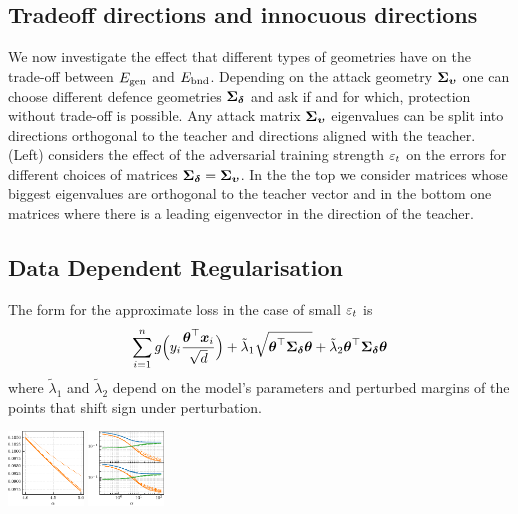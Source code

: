 \documentclass[a0paper,fleqn]{betterportraitposter}
\theoremstyle{plain}
\theoremstyle{definition}
\theoremstyle{remark}
\begin{document}
{\begin{multicols}{3}
\subsection{Tradeoff directions and innocuous directions}
We now investigate the effect that different types of geometries have on the trade-off between \(E_{\mathrm{gen}}\) and \(E_{\mathrm{bnd}}\). 
Depending on the attack geometry \(\boldsymbol{\Sigma}_{\boldsymbol{\upsilon}}\) one can choose different defence geometries \(\boldsymbol{\Sigma}_{\boldsymbol{\delta}}\) and ask if and for which, protection without trade-off is possible. 
Any attack matrix \(\boldsymbol{\Sigma}_{\boldsymbol{\upsilon}}\) eigenvalues can be split into 
directions orthogonal to the teacher and directions aligned with the teacher. 
 (Left) considers the effect of the adversarial training strength \(\varepsilon_t\) on the errors for different choices of matrices \(\boldsymbol{\Sigma}_{\boldsymbol{\delta}} = \boldsymbol{\Sigma}_{\boldsymbol{\upsilon}}\). 
In the the top we consider matrices whose biggest eigenvalues are orthogonal to the teacher vector and in the bottom one matrices where there is a leading eigenvector in the direction of the teacher.




\subsection{Data Dependent Regularisation}

The form for the approximate loss in the case of small \(\varepsilon_t\) is
\begin{equation}\label{eq:equivalent-adversarial-regularisation}
    \sum_{i = 1}^{n} 
    g \Big( y_{i} \frac{\boldsymbol{\theta}^\top \boldsymbol{x}_{i}}{\sqrt{d}} \Big) 
    + \tilde{\lambda}_1 \sqrt{\boldsymbol{\theta}^\top \boldsymbol{\Sigma}_{\boldsymbol{\delta}} \boldsymbol{\theta}} + \tilde{\lambda}_2 \boldsymbol{\theta}^\top \boldsymbol{\Sigma}_{\boldsymbol{\delta}} \boldsymbol{\theta}
\end{equation}
where \(\tilde{\lambda}_1\) and \(\tilde{\lambda}_2\) depend on the model's parameters and perturbed margins of the points that shift sign under perturbation. 

\begin{center}
\includegraphics[width=0.15\textwidth]{Assets/gen_lambda_optimal_sweep_alpha.pdf}
\includegraphics[width=0.15\textwidth]{Assets/effective_regularisation.pdf}
\end{center}


\end{multicols}}
\end{document}
